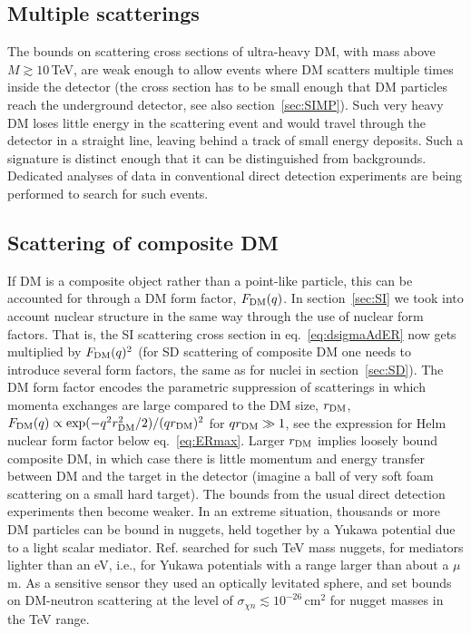 \subsection{Multiple scatterings}
The bounds on scattering cross sections of ultra-heavy DM, with mass above $M\gtrsim 10\,$TeV, 
are weak enough to allow events where DM scatters multiple times inside the detector \cite{ultraheavy:DM:direct} 
(the cross section has to be small enough that DM particles reach the underground detector, see also section~\ref{sec:SIMP}). 
Such very heavy DM loses little energy in the scattering event and would travel through the detector in a straight line, leaving behind a track of small energy deposits. Such a signature is distinct enough that it can be distinguished from backgrounds. 
Dedicated analyses of data in conventional direct detection experiments are being performed to search for such events.  


\subsection{Scattering of composite DM}
If DM is a composite object rather than a point-like particle,
this can be accounted for through a DM form factor, $F_{\rm DM}(q)$. In section~\ref{sec:SI} we took  into account nuclear structure in the same way through the use of nuclear form factors. That is, the SI scattering cross section in eq.~\eqref{eq:dsigmaAdER} now gets multiplied by  $F_{\rm DM}(q)^2$ (for SD scattering of composite DM one needs to introduce several form factors, the same as for nuclei in section~\ref{sec:SD}). 
The DM form factor encodes the parametric suppression of scatterings in which momenta exchanges are large compared to the DM size, $r_{\rm DM}$, $F_{\rm DM}(q)\propto \exp(-q^2 r_{\rm DM}^2/2) /(qr_{\rm DM})^2$ for $q r_{\rm DM}\gg 1$, 
see the expression for Helm nuclear form factor below eq.~\eqref{eq:ERmax}. 
Larger $r_{\rm DM}$ implies loosely bound composite DM, in which case there is little momentum and energy transfer between DM and the target in the detector (imagine a ball of very soft foam scattering on a small hard target). 
The bounds from the usual direct detection experiments then become weaker. 
In an extreme situation, thousands or more DM particles can be bound in nuggets, 
held together by a Yukawa potential due to a light scalar mediator. 
Ref. \cite{nugget:levitate} searched for such TeV mass nuggets, for mediators lighter than an eV, i.e., for Yukawa potentials with a range larger than about a $\mu$m. As a sensitive sensor they used an optically levitated sphere, and set bounds on DM-neutron scattering at the level of $\sigma_{\chi n}\lesssim 10^{-26}$\,cm${}^2$ for nugget masses in the TeV range.


